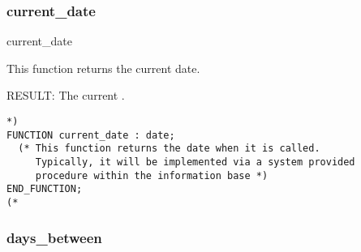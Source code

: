 \documentclass{article}
\begin{document}
\subsubsection{current\_date}

\begin{Mnamedesc}{current_date}
\begin{Mdesctext}
    This function returns the current date.
\end{Mdesctext}

\begin{Ipars}

\item[RESULT:] The current .
\end{Ipars}

\begin{Mexp}
\begin{verbatim}
*)
FUNCTION current_date : date;
  (* This function returns the date when it is called.
     Typically, it will be implemented via a system provided
     procedure within the information base *)
END_FUNCTION;
(*
\end{verbatim}
\end{Mexp}
\end{Mnamedesc}

\subsubsection{days\_between}
\end{document}
